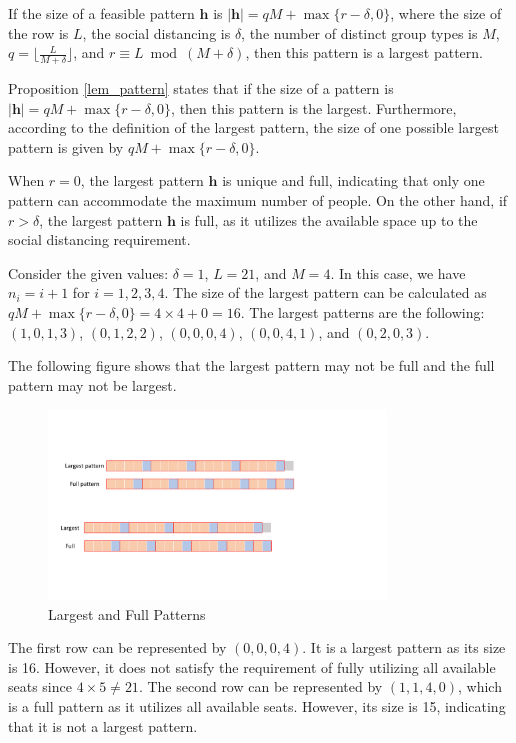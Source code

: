 \begin{prop}\label{lem_pattern}
If the size of a feasible pattern $\bm{h}$ is $|\bm{h}| = qM + \max\{r-\delta, 0\}$, where the size of the row is $L$, the social distancing is $\delta$, the number of distinct group types is $M$, $q = \lfloor \frac{L}{M + \delta} \rfloor$, and $r \equiv L \bmod (M + \delta)$, then this pattern is a largest pattern.
\end{prop}


Proposition \ref{lem_pattern} states that if the size of a pattern is $|\bm{h}| = qM + \max\{r-\delta, 0\}$, then this pattern is the largest. Furthermore, according to the definition of the largest pattern, the size of one possible largest pattern is given by $qM + \max\{r-\delta, 0\}$.

When $r = 0$, the largest pattern $\bm{h}$ is unique and full, indicating that only one pattern can accommodate the maximum number of people. On the other hand, if $r > \delta$, the largest pattern $\bm{h}$ is full, as it utilizes the available space up to the social distancing requirement.
    
\begin{example}
Consider the given values: $\delta = 1$, $L = 21$, and $M = 4$. In this case, we have $n_i = i + 1$ for $i = 1, 2, 3, 4$. The size of the largest pattern can be calculated as $qM + \max\{r-\delta, 0\} = 4 \times 4 + 0 = 16$. The largest patterns are the following: $(1, 0, 1, 3)$, $(0, 1, 2, 2)$, $(0, 0, 0, 4)$, $(0, 0, 4, 1)$, and $(0, 2, 0, 3)$.

The following figure shows that the largest pattern may not be full and the full pattern may not be largest.
\begin{figure}[ht]
    \centering
        \includegraphics[width=0.8\textwidth]{./Figures/full.pdf}
    \caption{Largest and Full Patterns}
\end{figure}

The first row can be represented by $(0, 0, 0, 4)$. It is a largest pattern as its size is 16. However, it does not satisfy the requirement of fully utilizing all available seats since $4 \times 5 \neq 21$.
The second row can be represented by $(1, 1, 4, 0)$, which is a full pattern as it utilizes all available seats. However, its size is 15, indicating that it is not a largest pattern.
\end{example}


